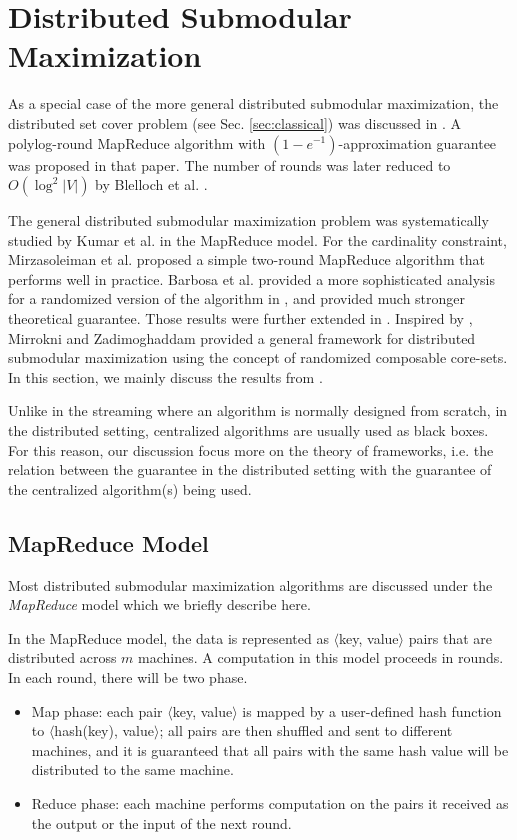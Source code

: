 \section{Distributed Submodular Maximization}
\label{sec:distributed}
As a special case of the more general distributed submodular maximization, the distributed set cover problem (see Sec. \ref{sec:classical}) was discussed in \cite{CKT10}. A polylog-round MapReduce algorithm with $(1-e^{-1})$-approximation guarantee was proposed in that paper. The number of rounds was later reduced to $O(\log^2 |V|)$  by Blelloch et al. \cite{BST12}. 

  The general distributed submodular maximization problem was systematically studied by Kumar et al. \cite{KMV+15} in the MapReduce model.  For the cardinality constraint, Mirzasoleiman et al. \cite{MKS+13} proposed a simple two-round MapReduce algorithm that performs well in practice. Barbosa et al. \cite{DEN+15} provided a more sophisticated analysis for a randomized version of the  algorithm in \cite{MKS+13}, and provided much stronger theoretical guarantee. Those results were further extended in \cite{BAN+2015new}. Inspired by \cite{MKS+13}, Mirrokni and Zadimoghaddam \cite{MZ15} provided a general framework for distributed submodular maximization using the concept of randomized composable core-sets. In this section, we mainly discuss the results from \cite{KMV+15,MKS+13,DEN+15,BAN+2015new,MZ15}.

Unlike in the streaming  where an algorithm is normally designed from scratch, in the distributed setting, centralized algorithms are usually used as black boxes. For this reason, our discussion focus more on the theory of frameworks, i.e. the relation between the guarantee in the distributed setting with the guarantee of the centralized algorithm(s) being used.


\subsection{MapReduce Model}
Most distributed submodular maximization algorithms are discussed under the \emph{MapReduce} model \cite{DG08} which we briefly describe here.

In the MapReduce model, the data is represented as $\langle$key, value$\rangle$ pairs that are distributed across $m$ machines. A computation in this model proceeds in rounds. In each round, there will be two phase.
\begin{itemize}
\item Map phase: each pair $\langle$key, value$\rangle$ is mapped by a user-defined hash function to $\langle$hash(key), value$\rangle$; all pairs are then shuffled and sent to different machines, and it is guaranteed that all pairs with the same hash value  will be distributed to the same machine.
\item Reduce phase: each machine performs computation on the pairs it received as the output or the input of the next round.
\end{itemize}

